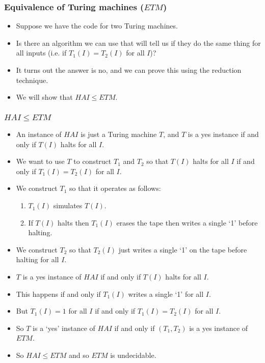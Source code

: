 \documentclass[handout]{beamer}
\begin{document}
\begin{frame}
\frametitle{Equivalence of Turing machines ($ETM$)}
\begin{itemize}
\item Suppose we have the code for two Turing machines. 
\vspace{0.4cm}
\item Is there an algorithm we can use that will tell us if they do the same thing for all inputs (i.e. if $T_1(I)=T_2(I)$ for all $I$)? 
\vspace{0.4cm}
\item It turns out the answer is no, and we can prove this using the reduction technique.
\vspace{0.4cm}
\item We will show that $HAI\leq ETM$.
\end{itemize} 
\end{frame}

\begin{frame}
\frametitle{$HAI\leq ETM$}
\begin{itemize}
\item An instance of $HAI$ is just a Turing machine $T$, and $T$ is a yes instance if and only if $T(I)$ halts for all $I$. 
\item We want to use $T$ to construct $T_1$ and $T_2$ so that $T(I)$ halts for all $I$ if and only if $T_1(I)=T_2(I)$ for all $I$. 
\item We construct $T_1$ so that it operates as follows:
\begin{enumerate}
\item $T_1(I)$ simulates $T(I)$.
\item If $T(I)$ halts then $T_1(I)$ erases the tape then writes a single `1' before halting. 
\end{enumerate} 
\item We construct $T_2$ so that $T_2(I)$ just writes a single `1' on the tape before halting for all $I$.
\item $T$ is a yes instance of $HAI$ if and only if $T(I)$ halts for all $I$. 
\item This happens if and only if $T_1(I)$ writes a single `1' for all $I$. 
\item But $T_1(I)=1$ for all $I$ if and only if $T_1(I)=T_2(I)$ for all $I$. 
\item So $T$ is a `yes' instance of $HAI$ if and only if $(T_1,T_2)$ is a yes instance of $ETM$. 
\item So $HAI\leq ETM$ and so $ETM$ is undecidable.
\end{itemize} 
\end{frame}
\end{document}
